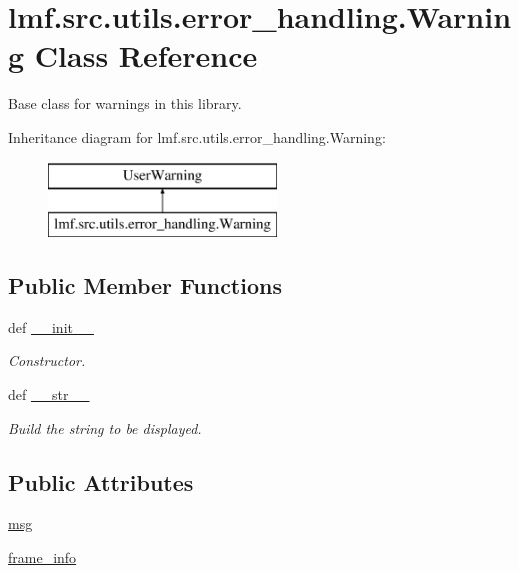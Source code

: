 \hypertarget{classlmf_1_1src_1_1utils_1_1error__handling_1_1_warning}{\section{lmf.\+src.\+utils.\+error\+\_\+handling.\+Warning Class Reference}
\label{classlmf_1_1src_1_1utils_1_1error__handling_1_1_warning}
}


Base class for warnings in this library.  


Inheritance diagram for lmf.\+src.\+utils.\+error\+\_\+handling.\+Warning\+:\begin{figure}[H]
\begin{center}
\leavevmode
\includegraphics[height=2.000000cm]{classlmf_1_1src_1_1utils_1_1error__handling_1_1_warning}
\end{center}
\end{figure}
\subsection*{Public Member Functions}
\begin{DoxyCompactItemize}
\item 
def \hyperlink{classlmf_1_1src_1_1utils_1_1error__handling_1_1_warning_a1ca035181464bbf15ed05f00ed430384}{\+\_\+\+\_\+init\+\_\+\+\_\+}
\begin{DoxyCompactList}\small\item\em Constructor. \end{DoxyCompactList}\item 
def \hyperlink{classlmf_1_1src_1_1utils_1_1error__handling_1_1_warning_a3dd52e27b533f30681c500081cac6982}{\+\_\+\+\_\+str\+\_\+\+\_\+}
\begin{DoxyCompactList}\small\item\em Build the string to be displayed. \end{DoxyCompactList}\end{DoxyCompactItemize}
\subsection*{Public Attributes}
\begin{DoxyCompactItemize}
\item 
\hyperlink{classlmf_1_1src_1_1utils_1_1error__handling_1_1_warning_a0933de123c20a65d4226d8294d1e3506}{msg}
\item 
\hyperlink{classlmf_1_1src_1_1utils_1_1error__handling_1_1_warning_abfcf05ce22e0fb5e6b81f167729c09c7}{frame\+\_\+info}
\end{DoxyCompactItemize}



